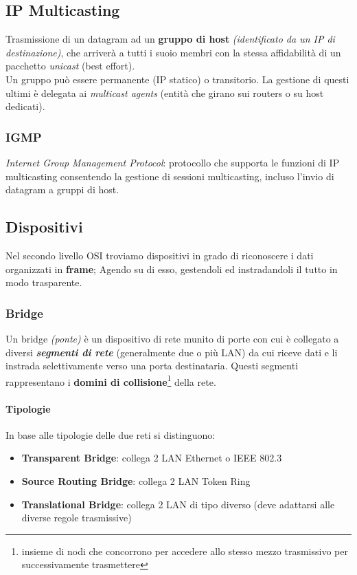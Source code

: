 \documentclass[a4paper,11pt]{article}
\def\subsub#1{\subsubsection{#1}\label{#1}}
\def\para#1{\paragraph{#1}\label{#1}}
\begin{document}
\subsection{IP Multicasting}
Trasmissione di un datagram ad un \textbf{gruppo di host}\textit{ (identificato da un IP di destinazione)}, che arriverà a tutti i suoio membri con la stessa affidabilità di un pacchetto \textit{unicast} (best effort).\\
Un gruppo può essere permanente (IP statico) o transitorio. La gestione di questi ultimi è delegata ai \textit{multicast agents} (entità che girano sui routers o su host dedicati).
\subsubsection{IGMP}
\textit{Internet Group Management Protocol}: protocollo che supporta le funzioni di IP multicasting consentendo la gestione di sessioni multicasting, incluso l'invio di datagram a gruppi di host.
\newpage
\subsection{Dispositivi} 
Nel secondo livello OSI troviamo dispositivi in grado di riconoscere i dati organizzati in \textbf{frame}; Agendo su di esso, gestendoli ed instradandoli il tutto in modo trasparente.
\subsub{Bridge} Un bridge \textit{(ponte)} è un dispositivo di rete munito di porte con cui è collegato a diversi \textbf{\textit{segmenti di rete}} (generalmente due o più LAN) da cui riceve dati e li instrada selettivamente verso una porta destinataria. Questi segmenti rappresentano i \textbf{domini di collisione}\footnote{insieme di nodi che concorrono per accedere allo stesso mezzo trasmissivo per successivamente trasmettere} della rete.
\para{Tipologie} In base alle tipologie delle due reti si distinguono:
\begin{itemize}
\item \textbf{Transparent Bridge}: collega 2 LAN Ethernet o IEEE 802.3
\item \textbf{Source Routing Bridge}: collega 2 LAN Token Ring
\item \textbf{Translational Bridge}: collega 2 LAN di tipo diverso (deve adattarsi alle diverse regole trasmissive)
\end{itemize}
\end{document}
